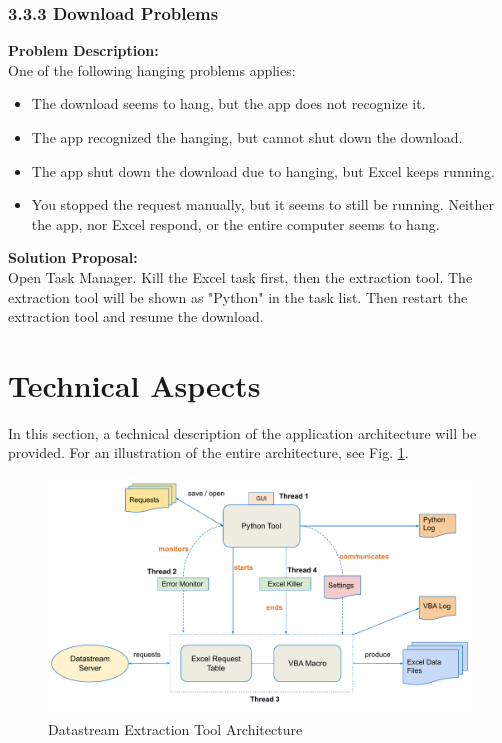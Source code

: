 \subsubsection{3.3.3 Download Problems}
\textbf{Problem Description: }  \\
One of the following hanging problems applies: 
\begin{itemize}
	\item The download seems to hang, but the app does not recognize it. 
	\item The app recognized the hanging, but cannot shut down the download. 
	\item The app shut down the download due to hanging, but Excel keeps running. 
	\item You stopped the request manually, but it seems to still be running. 
	Neither the app, nor Excel respond, or the entire computer seems to hang. 
\end{itemize} 
\textbf{Solution Proposal:} \\
Open Task Manager. Kill the Excel task first, then the extraction tool. The extraction tool will be shown as "Python" in the task list. Then restart the extraction tool and resume the download. 

\section{Technical Aspects}
In this section, a technical description of the application architecture will be provided. For an illustration of the entire architecture, see Fig. \ref{fig:ds-extraction-tool-arch}. 
\begin{figure}[h]
	\centering
	\includegraphics[width=1.1\linewidth]{figures/ds-extraction-tool-architecture}
	\caption{Datastream Extraction Tool Architecture}
	\label{fig:ds-extraction-tool-arch}
\end{figure}

